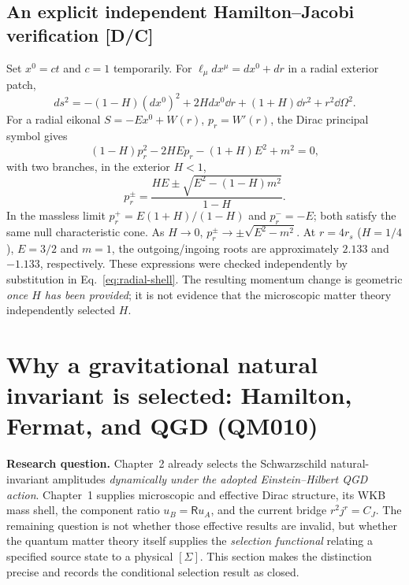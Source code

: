 \documentclass[11pt,a4paper]{article}
\begin{document}
\subsection{An explicit independent Hamilton--Jacobi verification [D/C]}
Set $x^0=ct$ and $c=1$ temporarily. For $\ell_\mu dx^\mu=dx^0+dr$ in a radial exterior patch,
\begin{equation}\label{eq:KS-components}
 ds^2=-(1-H)(dx^0)^2+2Hdx^0\dd r+(1+H)\dd r^2+r^2\dd\Omega^2.
\end{equation}
For a radial eikonal $S=-Ex^0+W(r)$, $p_r=W'(r)$, the Dirac principal symbol gives
\begin{equation}\label{eq:radial-shell}
 \boxed{(1-H)p_r^2-2HEp_r-(1+H)E^2+m^2=0,}
\end{equation}
with two branches, in the exterior $H<1$,
\begin{equation}\label{eq:radial-roots}
 \boxed{p_r^{\pm}=\frac{HE\pm\sqrt{E^2-(1-H)m^2}}{1-H}.}
\end{equation}
In the massless limit $p_r^+=E(1+H)/(1-H)$ and $p_r^-=-E$; both satisfy the same null characteristic cone. As $H\to0$, $p_r^\pm\to\pm\sqrt{E^2-m^2}$. At $r=4r_s$ ($H=1/4$), $E=3/2$ and $m=1$, the outgoing/ingoing roots are approximately $2.133$ and $-1.133$, respectively. These expressions were checked independently by substitution in Eq.~\eqref{eq:radial-shell}. The resulting momentum change is geometric \emph{once $H$ has been provided}; it is not evidence that the microscopic matter theory independently selected $H$.


\section{Why a gravitational natural invariant is selected: Hamilton, Fermat, and QGD (QM010)}\label{sec:selection-principle}
\textbf{Research question.} Chapter~2 already selects the Schwarzschild natural-invariant amplitudes \emph{dynamically under the adopted Einstein--Hilbert QGD action}. Chapter~1 supplies microscopic and effective Dirac structure, its WKB mass shell, the component ratio $u_B=\mathsf Ru_A$, and the current bridge $r^2j^r=C_J$. The remaining question is not whether those effective results are invalid, but whether the quantum matter theory itself supplies the \emph{selection functional} relating a specified source state to a physical $[\Sigma]$. This section makes the distinction precise and records the conditional selection result as closed.
\end{document}
